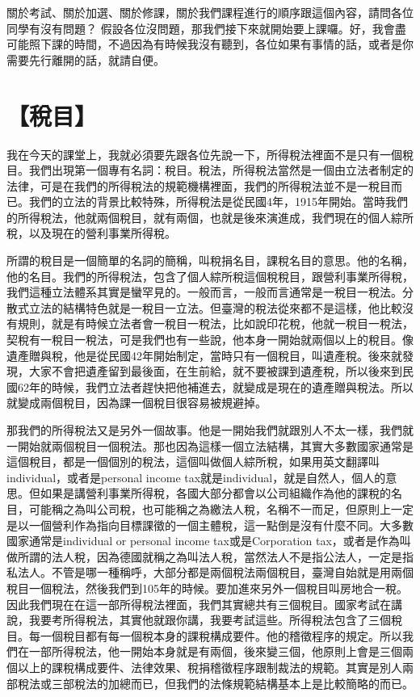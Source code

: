 \documentclass[]{ctexbook}
\begin{document}
關於考試、關於加選、關於修課，關於我們課程進行的順序跟這個內容，請問各位同學有沒有問題？ 假設各位沒問題，那我們接下來就開始要上課囉。好，我會盡可能照下課的時間，不過因為有時候我沒有聽到，各位如果有事情的話，或者是你需要先行離開的話，就請自便。

\hypertarget{ux7a05ux76ee}{%
\section{【稅目】}\label{ux7a05ux76ee}}

我在今天的課堂上，我就必須要先跟各位先說一下，所得稅法裡面不是只有一個稅目。我們出現第一個專有名詞：稅目。稅法，所得稅法當然是一個由立法者制定的法律，可是在我們的所得稅法的規範機構裡面，我們的所得稅法並不是一稅目而已。我們的立法的背景比較特殊，所得稅法是從民國4年，1915年開始。當時我們的所得稅法，他就兩個稅目，就有兩個，也就是後來演進成，我們現在的個人綜所稅，以及現在的營利事業所得稅。

所謂的稅目是一個簡單的名詞的簡稱，叫稅捐名目，課稅名目的意思。他的名稱，他的名目。我們的所得稅法，包含了個人綜所稅這個稅稅目，跟營利事業所得稅，我們這種立法體系其實是蠻罕見的。一般而言，一般而言通常是一稅目一稅法。分散式立法的結構特色就是一稅目一立法。但臺灣的稅法從來都不是這樣，他比較沒有規則，就是有時候立法者會一稅目一稅法，比如說印花稅，他就一稅目一稅法，契稅有一稅目一稅法，可是我們也有一些說，他本身一開始就兩個以上的稅目。像遺產贈與稅，他是從民國42年開始制定，當時只有一個稅目，叫遺產稅。後來就發現，大家不會把遺產留到最後面，在生前給，就不要被課到遺產稅，所以後來到民國62年的時候，我們立法者趕快把他補進去，就變成是現在的遺產贈與稅法。所以就變成兩個稅目，因為課一個稅目很容易被規避掉。

那我們的所得稅法又是另外一個故事。他是一開始我們就跟別人不太一樣，我們就一開始就兩個稅目一個稅法。那也因為這樣一個立法結構，其實大多數國家通常是這個稅目，都是一個個別的稅法，這個叫做個人綜所稅，如果用英文翻譯叫individual，或者是personal income tax就是individual，就是自然人，個人的意思。但如果是講營利事業所得稅，各國大部分都會以公司組織作為他的課稅的名目，可能稱之為叫公司稅，也可能稱之為繳法人稅，名稱不一而足，但原則上一定是以一個營利作為指向目標課徵的一個主體稅，這一點倒是沒有什麼不同。大多數國家通常是individual or personal income tax或是Corporation tax，或者是作為叫做所謂的法人稅，因為德國就稱之為叫法人稅，當然法人不是指公法人，一定是指私法人。不管是哪一種稱呼，大部分都是兩個稅法兩個稅目，臺灣自始就是用兩個稅目一個稅法，然後我們到105年的時候。要加進來另外一個稅目叫房地合一稅。因此我們現在在這一部所得稅法裡面，我們其實總共有三個稅目。國家考試在講說，我要考所得稅法，其實他就跟你講，我要考試這些。所得稅法包含了三個稅目。每一個稅目都有每一個稅本身的課稅構成要件。他的稽徵程序的規定。所以我們在一部所得稅法，他一開始本身就是有兩個，後來變三個，他原則上會是三個兩個以上的課稅構成要件、法律效果、稅捐稽徵程序跟制裁法的規範。其實是別人兩部稅法或三部稅法的加總而已，但我們的法條規範結構基本上是比較簡略的而已。
\end{document}
